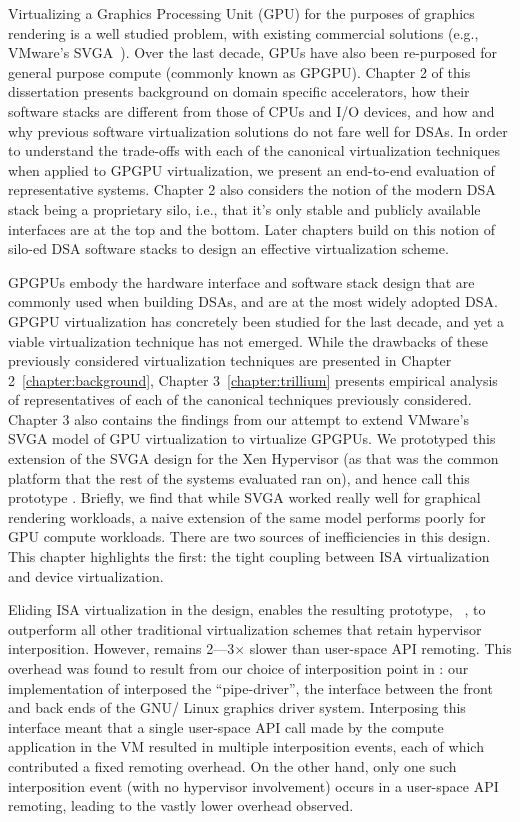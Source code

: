 Virtualizing a Graphics Processing Unit (GPU) for the purposes of graphics
rendering is a well studied problem, with existing commercial solutions (e.g.,
VMware’s SVGA~\cite{dowty2009gpu}). Over the last decade, GPUs have also been
re-purposed for general purpose compute (commonly known as GPGPU).
Chapter 2 of this dissertation presents background on domain specific
accelerators, how their software stacks are different from those of CPUs and
I/O devices, and how and why previous software virtualization solutions do not
fare well for DSAs. In order to understand the trade-offs with each of the
canonical virtualization techniques when applied to GPGPU virtualization, we
present an end-to-end evaluation of representative systems. Chapter 2 also
considers the notion of the modern DSA stack being a proprietary silo, i.e.,
that it's only stable and publicly available interfaces are at the top and the
bottom. Later chapters build on this notion of silo-ed DSA software stacks to
design an effective virtualization scheme.

GPGPUs embody the hardware interface and software stack design that are
commonly used when building DSAs, and are at the most widely adopted DSA.
GPGPU virtualization has concretely been studied for the last decade, and yet
a viable virtualization technique has not emerged. While the drawbacks of
these previously considered virtualization techniques are presented in Chapter
2~\ref{chapter:background}, Chapter 3~\ref{chapter:trillium} presents
empirical analysis of representatives of each of the canonical techniques
previously considered. Chapter 3 also contains the findings from our attempt
to extend VMware's SVGA model of GPU virtualization to virtualize GPGPUs. We
prototyped this extension of the SVGA design for the Xen Hypervisor (as that
was the common platform that the rest of the systems evaluated ran on), and
hence call this prototype \XenSVGA. Briefly, we find that while SVGA
worked really well for graphical rendering workloads, a naive extension of the
same model performs poorly for GPU compute workloads. There are two sources of
inefficiencies in this design. This chapter highlights the first: the tight
coupling between ISA virtualization and device virtualization.

Eliding ISA virtualization in the \XenSVGA design, enables the
resulting prototype, \Trillium~\cite{trillium}, to outperform all
other traditional virtualization schemes that retain hypervisor interposition.
However, \Trillium remains 2---3$\times$ slower than user-space API
remoting. This overhead was found to result from our choice of interposition
point in \Trillium: our implementation of \Trillium interposed the
``pipe-driver'', the interface between the front and back ends of the GNU/
Linux graphics driver system. Interposing this interface meant that a single
user-space API call made by the compute application in the VM resulted in
multiple interposition events, each of which contributed a fixed remoting
overhead. On the other hand, only one such interposition event (with no
hypervisor involvement) occurs in a user-space API remoting, leading to the
vastly lower overhead observed.


